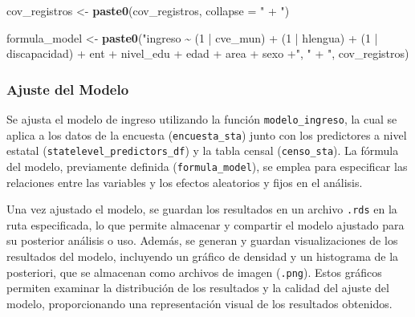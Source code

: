 \documentclass[
  12pt,
]{book}
\newenvironment{Shaded}{\begin{snugshade}}{\end{snugshade}}
\newcommand{\AttributeTok}[1]{\textcolor[rgb]{0.13,0.29,0.53}{#1}}
\newcommand{\FunctionTok}[1]{\textcolor[rgb]{0.13,0.29,0.53}{\textbf{#1}}}
\newcommand{\NormalTok}[1]{#1}
\newcommand{\OtherTok}[1]{\textcolor[rgb]{0.56,0.35,0.01}{#1}}
\newcommand{\StringTok}[1]{\textcolor[rgb]{0.31,0.60,0.02}{#1}}
\begin{document}
\begin{Shaded}
\begin{Highlighting}[]
\NormalTok{cov\_registros }\OtherTok{\textless{}{-}} \FunctionTok{paste0}\NormalTok{(cov\_registros, }\AttributeTok{collapse =} \StringTok{" + "}\NormalTok{)}

\NormalTok{formula\_model }\OtherTok{\textless{}{-}} 
  \FunctionTok{paste0}\NormalTok{(}\StringTok{"ingreso \textasciitilde{} (1 | cve\_mun) + (1 | hlengua) + (1 | discapacidad) + ent + nivel\_edu +  edad + area + sexo +"}\NormalTok{, }
      \StringTok{" + "}\NormalTok{, cov\_registros)}
\end{Highlighting}
\end{Shaded}

\hypertarget{ajuste-del-modelo}{%
\subsubsection*{Ajuste del Modelo}\label{ajuste-del-modelo}}

Se ajusta el modelo de ingreso utilizando la función \texttt{modelo\_ingreso}, la cual se aplica a los datos de la encuesta (\texttt{encuesta\_sta}) junto con los predictores a nivel estatal (\texttt{statelevel\_predictors\_df}) y la tabla censal (\texttt{censo\_sta}). La fórmula del modelo, previamente definida (\texttt{formula\_model}), se emplea para especificar las relaciones entre las variables y los efectos aleatorios y fijos en el análisis.

Una vez ajustado el modelo, se guardan los resultados en un archivo \texttt{.rds} en la ruta especificada, lo que permite almacenar y compartir el modelo ajustado para su posterior análisis o uso. Además, se generan y guardan visualizaciones de los resultados del modelo, incluyendo un gráfico de densidad y un histograma de la posteriori, que se almacenan como archivos de imagen (\texttt{.png}). Estos gráficos permiten examinar la distribución de los resultados y la calidad del ajuste del modelo, proporcionando una representación visual de los resultados obtenidos.
\end{document}
